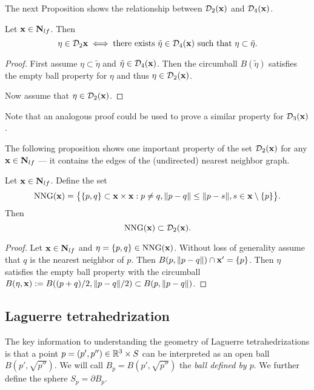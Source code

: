 The next Proposition shows the relationship between $\mathcal D_2({\mathbf{x}})$ and $\mathcal D_4({\mathbf{x}})$.
\begin{proposition}
	Let ${\mathbf{x}}\in\mathbf N_{lf}$. Then
	$$\eta \in \mathcal D_2{{\mathbf{x}}} \iff \text{there exists } \tilde\eta \in \mathcal D_4({\mathbf{x}}) \text{ such that } \eta\subset \tilde \eta.$$
\end{proposition}
\begin{proof}
	First assume $\eta \subset \tilde \eta$ and $\tilde\eta \in \mathcal D_4({\mathbf{x}})$. Then the circumball $B(\tilde\eta)$ satisfies the empty ball property for $\eta$ and thus $\eta \in \mathcal D_2({\mathbf{x}})$.

	Now assume that $\eta \in \mathcal D_2({\mathbf{x}})$. \tbd
\end{proof}
Note that an analogous proof could be used to prove a similar property for $\mathcal D_3({\mathbf{x}})$.\newline


\noindent The following proposition shows one important property of the set $\mathcal D_2({\mathbf{x}})$ for any ${\mathbf{x}} \in \mathbf N_{lf}$ --- it contains the edges of the (undirected) nearest neighbor graph.
\begin{proposition}\label{prop:nng}
	Let ${\mathbf{x}}\in\mathbf N_{lf}$. Define the set
	$$\mathrm{NNG}({\mathbf{x}}) = \big\{ \{p,q\}\subset {\mathbf{x}} \times {\mathbf{x}}: p\neq q, \|p-q\| \leq \|p-s\|, s\in {\mathbf{x}}\setminus\{p\}  \big\}.$$
	Then 
	$$\mathrm{NNG}({\mathbf{x}}) \subset \mathcal D_2({\mathbf{x}}).$$
\end{proposition}
\begin{proof}
	Let ${\mathbf{x}}\in \mathbf N_{lf}$ and $\eta =\{p,q\} \in \mathrm{NNG}({\mathbf{x}})$. Without loss of generality assume that $q$ is the nearest neighbor of $p$. Then $ B(p,\|p-q\|)\cap {\mathbf{x}}' = \{p\}$. Then $\eta$ satisfies the empty ball property with the circumball $ B(\eta,{\mathbf{x}}) := B((p+q)/2,\|p-q\|/2) \subset B(p,\|p-q\|)$.
\end{proof}



\subsection{Laguerre tetrahedrization}

The key information to understanding the geometry of Laguerre tetrahedrizations is that a point $p=(p',p'')\in {\mathbb R^3}\times S$ can be interpreted as an open ball $B(p',\sqrt{p''})$. We will call $B_p = B(p',\sqrt{p''})$ the \textit{ball defined by $p$}. We further define the sphere $S_p=\partial B_p$. 



